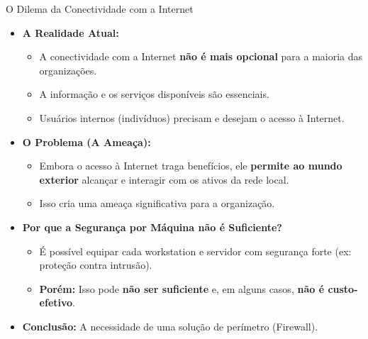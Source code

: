 \begin{frame}{O Dilema da Conectividade com a Internet}
    \begin{itemize}
        \item \textbf{A Realidade Atual:}
              \begin{itemize}
                  \item A conectividade com a Internet \textbf{não é mais opcional} para a maioria das organizações.
                  \item A informação e os serviços disponíveis são essenciais.
                  \item Usuários internos (indivíduos) precisam e desejam o acesso à Internet.
              \end{itemize}

        \item \textbf{O Problema (A Ameaça):}
              \begin{itemize}
                  \item Embora o acesso à Internet traga benefícios, ele \textbf{permite ao mundo exterior} alcançar e interagir com os ativos da rede local.
                  \item Isso cria uma ameaça significativa para a organização.
              \end{itemize}

        \item \textbf{Por que a Segurança por Máquina não é Suficiente?}
              \begin{itemize}
                  \item É possível equipar cada workstation e servidor com segurança forte (ex: proteção contra intrusão).
                  \item \textbf{Porém:} Isso pode \textbf{não ser suficiente} e, em alguns casos, \textbf{não é custo-efetivo}.
              \end{itemize}
        \item \textbf{Conclusão:} A necessidade de uma solução de perímetro (Firewall).
    \end{itemize}
\end{frame}


